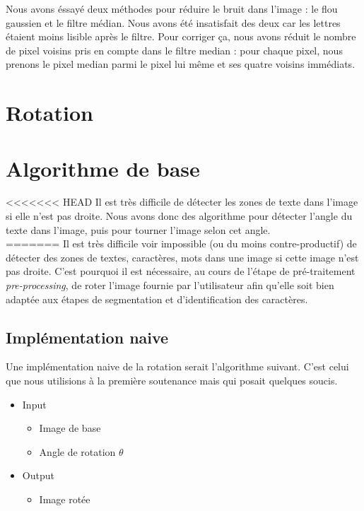 Nous avons éssayé deux méthodes pour réduire le bruit dans l'image : le flou gaussien et le filtre médian. Nous avons été insatisfait des deux car les lettres étaient moins lisible après le filtre. Pour corriger ça, nous avons réduit le nombre de pixel voisins pris en compte dans le filtre median : pour chaque pixel, nous prenons le pixel median parmi le pixel lui même et ses quatre voisins immédiats.\\

\section{Rotation}
\section{Algorithme de base}

<<<<<<< HEAD
Il est très difficile de détecter les zones de texte dans l'image si elle n'est pas droite. Nous avons donc des algorithme pour détecter l'angle du texte dans l'image, puis pour tourner l'image selon cet angle.\\
=======
Il est très difficile voir impossible (ou du moins contre-productif) de
détecter des zones de textes, caractères, mots dans une image si cette image
n'est pas droite. C'est pourquoi il est nécessaire, au cours de l'étape de
pré-traitement \emph{pre-processing}, de roter l'image fournie par l'utilisateur
afin qu'elle soit bien adaptée aux étapes de segmentation et d'identification
des caractères. \\

\subsection{Implémentation naive}

Une implémentation naive de la rotation serait l'algorithme suivant. C'est
celui que nous utilisions à la première soutenance mais qui posait quelques
soucis. \\

\begin{itemize}
  \item{Input} \\
    \begin{itemize}
      \item Image de base
      \item Angle de rotation $\theta$
    \end{itemize}
  \item{Output}
    \begin{itemize}
      \item Image rotée
    \end{itemize}
\end{itemize}

